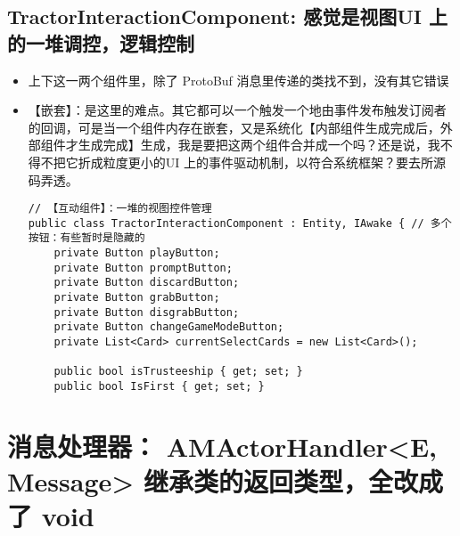 \documentclass[9pt, b5paper]{article}
\begin{document}
\subsection{TractorInteractionComponent: 感觉是视图UI 上的一堆调控，逻辑控制}
\label{sec-3-8}
\begin{itemize}
\item 上下这一两个组件里，除了 ProtoBuf 消息里传递的类找不到，没有其它错误
\item 【嵌套】：是这里的难点。其它都可以一个触发一个地由事件发布触发订阅者的回调，可是当一个组件内存在嵌套，又是系统化【内部组件生成完成后，外部组件才生成完成】生成，我是要把这两个组件合并成一个吗？还是说，我不得不把它折成粒度更小的UI 上的事件驱动机制，以符合系统框架？要去所源码弄透。
\begin{verbatim}
// 【互动组件】：一堆的视图控件管理 
public class TractorInteractionComponent : Entity, IAwake { // 多个按钮：有些暂时是隐藏的
    private Button playButton;
    private Button promptButton;
    private Button discardButton;
    private Button grabButton;
    private Button disgrabButton;
    private Button changeGameModeButton;
    private List<Card> currentSelectCards = new List<Card>();

    public bool isTrusteeship { get; set; }
    public bool IsFirst { get; set; }
\end{verbatim}
\end{itemize}








\section{消息处理器： AMActorHandler<E, Message> 继承类的返回类型，全改成了 void}
\label{sec-4}
\end{document}

